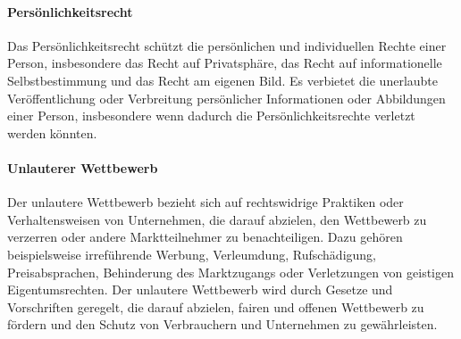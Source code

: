 \paragraph{Persönlichkeitsrecht}

Das Persönlichkeitsrecht schützt die persönlichen und individuellen Rechte einer Person, insbesondere das Recht auf Privatsphäre, das Recht auf informationelle Selbstbestimmung und das Recht am eigenen Bild. Es verbietet die unerlaubte Veröffentlichung oder Verbreitung persönlicher Informationen oder Abbildungen einer Person, insbesondere wenn dadurch die Persönlichkeitsrechte verletzt werden könnten.

\paragraph{Unlauterer Wettbewerb}

Der unlautere Wettbewerb bezieht sich auf rechtswidrige Praktiken oder Verhaltensweisen von Unternehmen, die darauf abzielen, den Wettbewerb zu verzerren oder andere Marktteilnehmer zu benachteiligen. Dazu gehören beispielsweise irreführende Werbung, Verleumdung, Rufschädigung, Preisabsprachen, Behinderung des Marktzugangs oder Verletzungen von geistigen Eigentumsrechten. Der unlautere Wettbewerb wird durch Gesetze und Vorschriften geregelt, die darauf abzielen, fairen und offenen Wettbewerb zu fördern und den Schutz von Verbrauchern und Unternehmen zu gewährleisten.